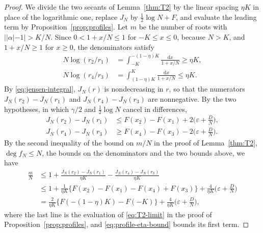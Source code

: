 \begin{proof}
We divide the two secants of Lemma~\ref{thm:T2} by the linear spacing
$\eta K$ in place of the logarithmic one, replace $J_N$ by
$\frac12\log N+F$, and evaluate the leading term by
Proposition~\ref{prop:profiles}.
Let $m$ be the number of roots with $||\alpha|-1|>K/N$.
Since $0<1+x/N\le1$ for $-K\le x\le0$, because $N>K$, and
$1+x/N\ge1$ for $x\ge0$, the denominators satisfy
\begin{align*}
 N\log(r_2/r_1)&=\int_{-K}^{-(1-\eta)K}\frac{\mathrm dx}{1+x/N}\ge\eta K,\\
 N\log(r_4/r_3)&=\int_{(1-\eta)K}^{K}\frac{\mathrm dx}{1+x/N}\le\eta K.
\end{align*}
By \eqref{eq:jensen-integral}, $J_N(r)$ is nondecreasing in $r$, so that
the numerators $J_N(r_2)-J_N(r_1)$ and $J_N(r_4)-J_N(r_3)$ are
nonnegative. By the two hypotheses, in which $\gamma/2$ and
$\frac12\log N$ cancel in differences,
\begin{align*}
 J_N(r_2)-J_N(r_1)&\le F(x_2)-F(x_1)+2\Big(\varepsilon+\frac DN\Big),\\
 J_N(r_4)-J_N(r_3)&\ge F(x_4)-F(x_3)-2\Big(\varepsilon+\frac DN\Big).
\end{align*}
By the second inequality of the bound on $m/N$ in the proof of
Lemma~\ref{thm:T2}, $\deg f_N\le N$, the bounds on the denominators and
the two bounds above, we have
\begin{align*}
 \frac mN
 &\le1+\frac{J_N(r_2)-J_N(r_1)}{\eta K}-\frac{J_N(r_4)-J_N(r_3)}{\eta K}\\
 &\le1+\frac1{\eta K}\{F(x_2)-F(x_1)-F(x_4)+F(x_3)\}
 +\frac4{\eta K}\Big(\varepsilon+\frac DN\Big)\\
 &=\frac2{\eta K}\{F(-(1-\eta)K)-F(-K)\}
 +\frac4{\eta K}\Big(\varepsilon+\frac DN\Big),
\end{align*}
where the last line is the evaluation of \eqref{eq:T2-limit} in the proof
of Proposition~\ref{prop:profiles}, and \eqref{eq:profile-eta-bound}
bounds its first term.
\end{proof}

